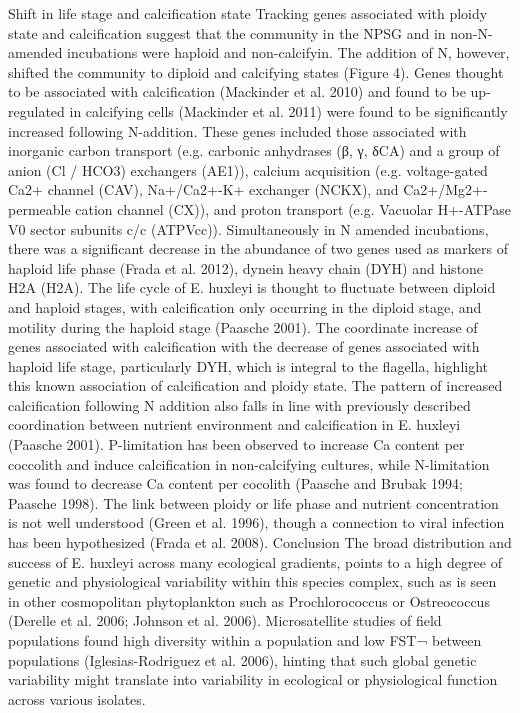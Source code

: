 Shift in life stage and calcification state
Tracking genes associated with ploidy state and calcification suggest that the community in the NPSG and in non-N-amended incubations were haploid and non-calcifyin. The addition of N, however, shifted the community to diploid and calcifying states (Figure 4). Genes thought to be associated with calcification (Mackinder et al. 2010) and found to be up-regulated in calcifying cells (Mackinder et al. 2011) were found to be significantly increased following N-addition. These genes included those associated with inorganic carbon transport (e.g. carbonic anhydrases (β, γ, δCA) and a group of anion (Cl / HCO3) exchangers (AE1)), calcium acquisition (e.g. voltage-gated Ca2+ channel (CAV), Na+/Ca2+-K+ exchanger (NCKX), and Ca2+/Mg2+-permeable cation channel (CX)), and proton transport (e.g. Vacuolar H+-ATPase V0 sector subunits c/c (ATPVcc)). Simultaneously in N amended incubations, there was a significant decrease in the abundance of two genes used as markers of haploid life phase (Frada et al. 2012), dynein heavy chain (DYH) and histone H2A (H2A). The life cycle of E. huxleyi is thought to fluctuate between diploid and haploid stages, with calcification only occurring in the diploid stage, and motility during the haploid stage (Paasche 2001). The coordinate increase of genes associated with calcification with the decrease of genes associated with haploid life stage, particularly DYH, which is integral to the flagella, highlight this known association of calcification and ploidy state. The pattern of increased calcification following N addition also falls in line with previously described coordination between nutrient environment and calcification in E. huxleyi (Paasche 2001). P-limitation has been observed to increase Ca content per coccolith and induce calcification in non-calcifying cultures, while N-limitation was found to decrease Ca content per cocolith (Paasche and Brubak 1994; Paasche 1998). The link between ploidy or life phase and nutrient concentration is not well understood (Green et al. 1996), though a connection to viral infection has been hypothesized (Frada et al. 2008). 
Conclusion
The broad distribution and success of E. huxleyi across many ecological gradients, points to a high degree of genetic and physiological variability within this species complex, such as is seen in other cosmopolitan phytoplankton such as Prochlorococcus or Ostreococcus (Derelle et al. 2006; Johnson et al. 2006). Microsatellite studies of field populations found high diversity within a population and low FST¬ between populations (Iglesias-Rodriguez et al. 2006), hinting that such global genetic variability might translate into variability in ecological or physiological function across various isolates. 
